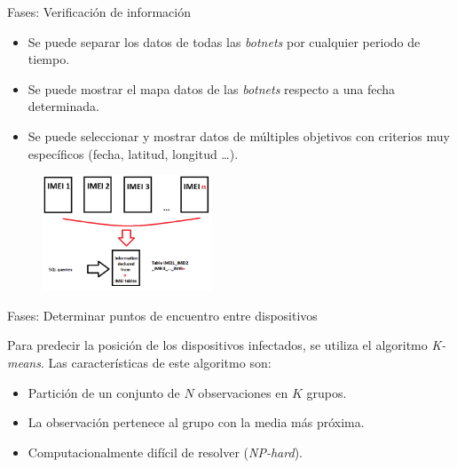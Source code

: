 \documentclass[aspectratio=43]{beamer}
\begin{document}
\begin{frame}{Fases: Verificación de información}

\begin{itemize}
\item Se puede separar los datos de todas las \emph{botnets} por cualquier periodo de tiempo.

\item Se puede mostrar el mapa datos de las \emph{botnets} respecto a una fecha determinada.

\item Se puede seleccionar y mostrar datos de múltiples objetivos con criterios muy específicos (fecha, latitud, longitud \ldots).
\end{itemize}

  	\begin{figure}[htbp] 

   \includegraphics[width=0.45\textwidth]{figuras/IMEIsConcatenados}  
  \label{IMEIsConcatenados}

\end{figure}

\end{frame}

\begin{frame}{Fases: Determinar puntos de encuentro entre dispositivos}

Para predecir la posición de los dispositivos infectados, se utiliza el algoritmo \emph{K-means}. Las características de este algoritmo son:

\begin{itemize}
\item Partición de un conjunto de $N$ observaciones en $K$ grupos.
\item La observación pertenece al grupo con la media más próxima.
\item Computacionalmente difícil de resolver (\emph{NP-hard}).
\end{itemize}
  
\end{frame}
\end{document}
